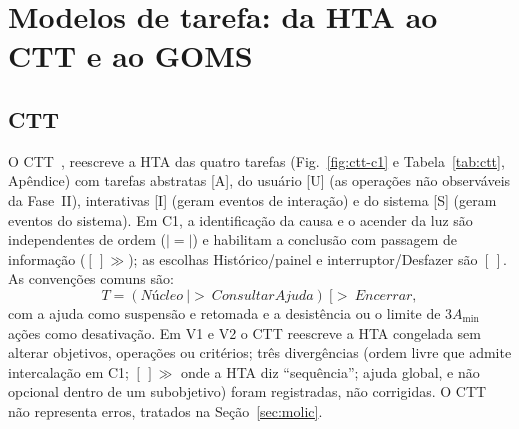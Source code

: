 \documentclass[conference]{IEEEtran}
\newcommand{\enabinfo}{\ensuremath{[\,]\!\gg}}
\newcommand{\choice}{\ensuremath{[\,]}}
\newcommand{\ordind}{\ensuremath{|\!=\!|}}
\newcommand{\deact}{\ensuremath{[>}}
\newcommand{\susp}{\ensuremath{|>}}
\begin{document}
\begin{table}[!t]
\caption{Esquema conceitual de signos estendido --- S2, S3, S4, ajuda e diálogos}
\label{tab:signos2}
\centering

\end{table}

\section{Modelos de tarefa: da HTA ao CTT e ao GOMS}\label{sec:tarefas}

\subsection{CTT}
O CTT~\cite{barbosa2010}, \cite[seç.~18.3]{dix2004} reescreve a HTA das quatro tarefas (Fig.~\ref{fig:ctt-c1} e Tabela~\ref{tab:ctt}, Apêndice) com tarefas abstratas [A], do usuário [U] (as operações não observáveis da Fase~II), interativas [I] (geram eventos de interação) e do sistema [S] (geram eventos do sistema). Em C1, a identificação da causa e o acender da luz são independentes de ordem (\ordind) e habilitam a conclusão com passagem de informação (\enabinfo); as escolhas Histórico/painel e interruptor/Desfazer são \choice. As convenções comuns são:
\begin{equation*}
T = (\mathit{Núcleo}\ \susp\ \mathit{ConsultarAjuda})\ \deact\ \mathit{Encerrar},
\end{equation*}
com a ajuda como suspensão e retomada e a desistência ou o limite de $3A_{\min}$ ações como desativação. Em V1 e V2 o CTT reescreve a HTA congelada sem alterar objetivos, operações ou critérios; três divergências (ordem livre que admite intercalação em C1; \enabinfo{} onde a HTA diz ``sequência''; ajuda global, e não opcional dentro de um subobjetivo) foram registradas, não corrigidas. O CTT não representa erros, tratados na Seção~\ref{sec:molic}.
\end{document}
